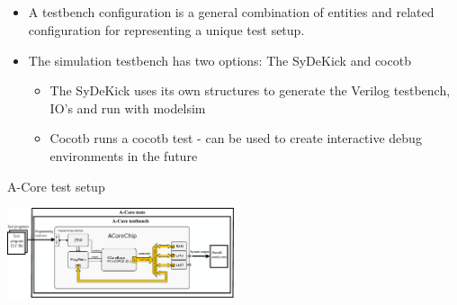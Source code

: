 \documentclass{sdkslides}
\begin{document}
\subsection*{\sectionname}
\begin{frame}[t,fragile]
    \frametitle{\sectionname}
    \begin{itemize}
        \item A testbench configuration is a general combination of entities
            and related configuration for representing a unique test setup.
        \item The simulation testbench has two options: The SyDeKick and cocotb
        \begin{itemize}
            \item The SyDeKick uses its own structures to generate the Verilog testbench, IO's and run with modelsim
            \item Cocotb runs a cocotb test - can be used to create interactive debug environments in the future
        \end{itemize}
    \end{itemize}
    \begin{block}{A-Core test setup}
        \begin{center}
            \includegraphics[width=0.5\textwidth]{./Pics/A-Core_testsetup.eps}
        \end{center}
    \end{block}
\end{frame}

\renewcommand{\sectionname}{ACoreTests}
\end{document}
